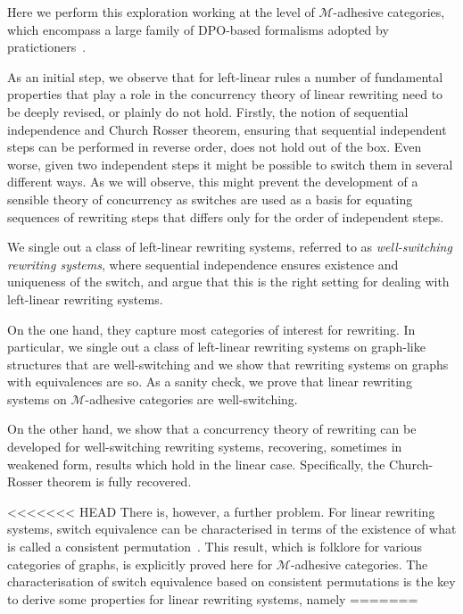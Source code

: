 \documentclass[a4paper,UKenglish,cleveref,pdftex,thm-restate,numberwithinsect,anonymous]{lipics}
\begin{document}

Here we perform this exploration working at the level of $\mathcal{M}$-adhesive categories, 
which encompass a large family of DPO-based formalisms adopted by pratictioners~\cite{xxx}. 

As an initial step, %
we observe that for
left-linear rules a number of fundamental properties that play a role
in the concurrency theory of linear rewriting need to be deeply revised, or
plainly do not hold.
%
Firstly, the notion of sequential independence and Church Rosser
theorem, ensuring that sequential independent steps can be performed
in reverse order, does not hold out of the box. Even worse, given two
independent steps it might be possible to switch them in several
different ways. As we will observe, this might prevent the development
of a sensible theory of concurrency as switches are used as a basis
for equating sequences of rewriting steps that differs only for the order of independent
steps.

We single out a class of left-linear rewriting
systems, referred to as \emph{well-switching rewriting systems}, where sequential independence ensures existence and uniqueness of the
switch, and argue that this is the right setting for dealing with
left-linear rewriting systems.


On the one hand, they capture most categories of
interest for rewriting. In particular, we single out a class of
left-linear rewriting systems on graph-like structures that are
well-switching and we show that rewriting systems on graphs with
equivalences are so. 
As a sanity check, we prove that linear rewriting systems on
$\mathcal{M}$-adhesive categories are well-switching.

On the other hand, we show that a concurrency theory of rewriting can
be developed for well-switching rewriting systems, recovering, sometimes in
weakened form, results which hold in the linear case.  Specifically, 
the Church-Rosser theorem is fully recovered.


<<<<<<< HEAD
There is, however, a further problem.  For linear
rewriting systems, switch equivalence can be characterised in terms of the
existence of what is called a consistent permutation~\cite{xxx}.
This result, which
is folklore for various categories of graphs, is explicitly proved
here for $\mathcal{M}$-adhesive categories.
%
The characterisation of switch equivalence based on consistent
permutations is the key to derive some
properties for linear rewriting systems, namely
=======
\end{document}

